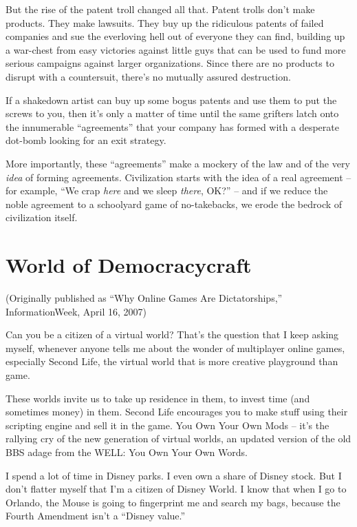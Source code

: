 But the rise of the patent troll changed all that. Patent trolls
don't make products. They make lawsuits. They buy up the ridiculous
patents of failed companies and sue the everloving hell out of
everyone they can find, building up a war-chest from easy victories
against little guys that can be used to fund more serious campaigns
against larger organizations. Since there are no products to
disrupt with a countersuit, there's no mutually assured
destruction.

If a shakedown artist can buy up some bogus patents and use them to
put the screws to you, then it's only a matter of time until the
same grifters latch onto the innumerable ``agreements'' that your
company has formed with a desperate dot-bomb looking for an exit
strategy.

More importantly, these ``agreements'' make a mockery of the law and
of the very \emph{idea} of forming agreements. Civilization
starts with the idea of a real agreement -- for example, ``We crap
\emph{here} and we sleep \emph{there}, OK?'' -- and if we reduce
the noble agreement to a schoolyard game of no-takebacks, we erode
the bedrock of civilization itself.

\section{World of Democracycraft}

(Originally published as ``Why Online Games Are Dictatorships,''
InformationWeek, April 16, 2007)

Can you be a citizen of a virtual world? That's the question that I
keep asking myself, whenever anyone tells me about the wonder of
multiplayer online games, especially Second Life, the virtual world
that is more creative playground than game.

These worlds invite us to take up residence in them, to invest time
(and sometimes money) in them. Second Life encourages you to make
stuff using their scripting engine and sell it in the game. You Own
Your Own Mods -- it's the rallying cry of the new generation of
virtual worlds, an updated version of the old BBS adage from the
WELL: You Own Your Own Words.

I spend a lot of time in Disney parks. I even own a share of Disney
stock. But I don't flatter myself that I'm a citizen of Disney
World. I know that when I go to Orlando, the Mouse is going to
fingerprint me and search my bags, because the Fourth Amendment
isn't a ``Disney value.''

